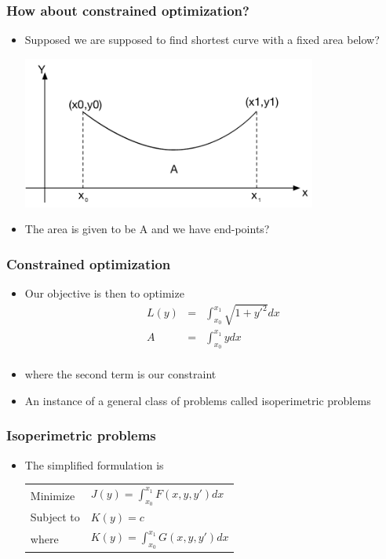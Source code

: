 \documentclass[10pt]{beamer}
\begin{document}
\begin{frame}
  \frametitle{How about constrained optimization?}
  \begin{itemize}
  \item Supposed we are supposed to find shortest curve with a fixed area below?
    \centerline{\includegraphics[height=5cm]{constrained}}
  \item The area is given to be A and we have end-points? 
  \end{itemize}
\end{frame}

\begin{frame}
  \frametitle{Constrained optimization}
  \begin{itemize}
  \item Our objective is then to optimize
    \[
      \begin{array}{rcl}
        L(y) &=& \int_{x_0}^{x_1} \sqrt{ 1 + y'^2} dx\\[3mm]
        A    &=& \int_{x_0}^{x_1} y dx\\
      \end{array}
    \]
  \item where the second term is our constraint
  \item An instance of a general class of problems called isoperimetric problems
  \end{itemize}
\end{frame}

\begin{frame}
  \frametitle{Isoperimetric problems}
  \begin{itemize}
  \item The simplified formulation is\\
    
    \begin{tabular}{ll}
      Minimize & $J(y) = \int_{x_0}^{x_1} F(x,y,y') dx$\\
      Subject to & $K(y) = c$ \\
      where & $K(y) = \int_{x_0}^{x_1} G(x, y,y') dx$
    \end{tabular}
  \end{itemize}
\end{frame}
\end{document}
